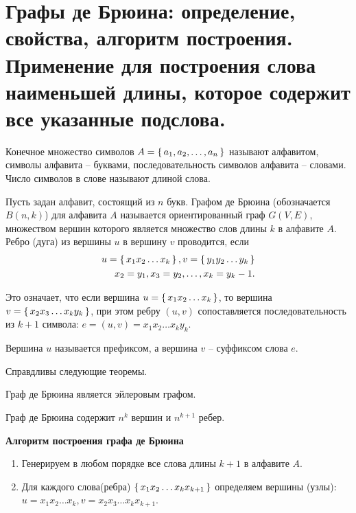 \section{Графы де Брюина: определение, свойства, алгоритм построения. Применение для построения 
слова наименьшей длины, которое содержит все указанные подслова.}

\begin{definition}
    Конечное множество символов $A = \set{a_1, a_2,\dots,a_n}$ называют
    алфавитом, символы алфавита -- буквами, последовательность символов
    алфавита -- словами. Число символов в слове называют длиной слова.
\end{definition}

\begin{definition}
    Пусть задан алфавит, состоящий из $n$ букв. Графом де Брюина
    (обозначается $B(n,k)$) для алфавита $A$ называется ориентированный граф
    $G(V,E)$, множеством вершин которого является множество слов длины $k$ в
    алфавите $A$. Ребро (дуга) из вершины $u$ в вершину $v$ проводится, если 
    \begin{align*}
        u = \set{x_1x_2 \dots x_k} , v = \set{y_1y_2 \dots y_k} \\
        x_2 = y_1, x_3=y_2,\dots, x_k=y_k-1.
    \end{align*}
\end{definition}

Это означает, что если вершина $u = \set{x_1x_2 \dots x_k}$,
то вершина \\ $v = \set{x_2x_3 \dots x_ky_k}$,
при этом ребру $(u, v)$ сопоставляется последовательность из $k+1$ символа:
$e = (u, v) = {x_1x_2 \dots x_ky_k}$.

Вершина $u$ называется префиксом, а вершина $v$ -- суффиксом слова $e$.

Справдливы следующие теоремы.

\begin{theorem}
    Граф де Брюина является эйлеровым графом.
\end{theorem}

\begin{theorem}
    Граф де Брюина содержит $n^k$ вершин и $n^{k+1}$ ребер.
\end{theorem}

\textbf{Алгоритм построения графа де Брюина}
\begin{enumerate}[left=0.0em, labelsep=1em, topsep=0.0em, itemsep=0pt, parsep=0.5em]
    \item Генерируем в любом порядке все слова длины $k+1$ в алфавите $A$.
    \item Для каждого слова(ребра) $\set{x_1x_2 \dots x_kx_{k+1}}$ определяем вершины (узлы):
    $u = {x_1x_2 \dots x_k}, v={x_2x_3 \dots x_kx_{k+1}}$.
\end{enumerate}

